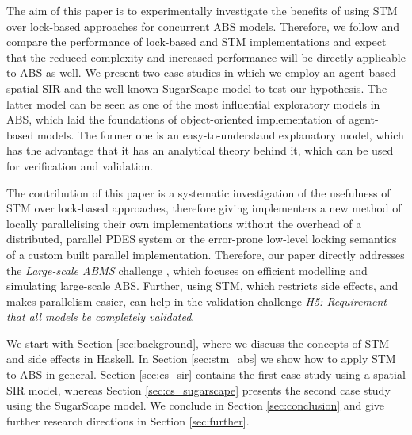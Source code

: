\medskip

The aim of this paper is to experimentally investigate the benefits of using STM over lock-based approaches for concurrent ABS models. Therefore, we follow \cite{discolo_lock_2006} and compare the performance of lock-based and STM implementations and expect that the reduced complexity and increased performance will be directly applicable to ABS as well. We present two case studies in which we employ an agent-based spatial SIR \cite{macal_agent-based_2010, thaler_pure_2018} and the well known SugarScape \cite{epstein_growing_1996} model to test our hypothesis. The latter model can be seen as one of the most influential exploratory models in ABS, which laid the foundations of object-oriented implementation of agent-based models. The former one is an easy-to-understand explanatory model, which has the advantage that it has an analytical theory behind it, which can be used for verification and validation. 

The contribution of this paper is a systematic investigation of the usefulness of STM over lock-based approaches, therefore giving implementers a new method of locally parallelising their own implementations without the overhead of a distributed, parallel PDES system or the error-prone low-level locking semantics of a custom built parallel implementation. Therefore, our paper directly addresses the \textit{Large-scale ABMS} challenge \cite{macal_everything_2016}, which focuses on efficient modelling and simulating large-scale ABS. Further, using STM, which restricts side effects, and makes parallelism easier, can help in the validation challenge \cite{macal_everything_2016} \emph{H5: Requirement that all models be completely validated}.

We start with Section \ref{sec:background}, where we discuss the concepts of STM and side effects in Haskell. In Section \ref{sec:stm_abs} we show how to apply STM to ABS in general. Section \ref{sec:cs_sir} contains the first case study using a spatial SIR model, whereas Section \ref{sec:cs_sugarscape} presents the second case study using the SugarScape model. We conclude in Section \ref{sec:conclusion} and give further research directions in Section \ref{sec:further}.